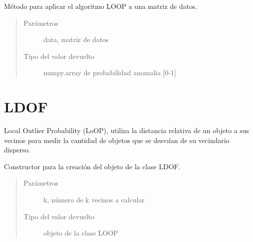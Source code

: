 \documentclass[letterpaper,10pt,spanish]{sphinxmanual}
\begin{document}

\begin{fulllineitems}
Método para aplicar el algoritmo LOOP a una matriz de datos.
\begin{quote}\begin{description}
\item[{Parámetros}] \leavevmode
{} \textendash{} data, matriz de datos

\item[{Tipo del valor devuelto}] \leavevmode
numpy.array de probabilidad anomalia {[}0-1{]}

\end{description}\end{quote}

\end{fulllineitems}



\chapter{LDOF}
\label{\detokenize{index:ldof}}
Local Outlier Probability (LoOP), utiliza la distancia relativa
de un objeto a sus vecinos para medir la cantidad de objetos que se desvıían
de su vecindario disperso.

\begin{fulllineitems}
\label{\detokenize{index:LDOF}}
Constructor para la creación del objeto de la clase LDOF.
\begin{quote}\begin{description}
\item[{Parámetros}] \leavevmode
{} \textendash{} k, número de k vecinos a calcular

\item[{Tipo del valor devuelto}] \leavevmode
objeto de la clase LOOP

\end{description}\end{quote}

\end{fulllineitems}

\end{document}
